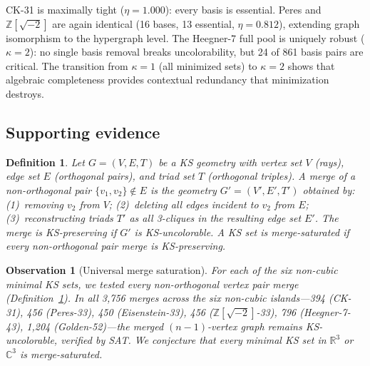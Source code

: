 \documentclass[12pt,a4paper]{article}
\newtheorem{definition}[theorem]{Definition}
\newtheorem{observation}[theorem]{Observation}
\newcommand{\R}{\mathbb{R}}
\newcommand{\C}{\mathbb{C}}
\newcommand{\Z}{\mathbb{Z}}
\begin{document}
CK-31 is maximally tight ($\eta = 1.000$): every basis is essential.  Peres and $\Z[\sqrt{-2}]$ are again identical (16 bases, 13 essential, $\eta = 0.812$), extending graph isomorphism to the hypergraph level.  The Heegner-7 full pool is uniquely robust ($\kappa = 2$): no single basis removal breaks uncolorability, but 24 of 861 basis pairs are critical.  The transition from $\kappa = 1$ (all minimized sets) to $\kappa = 2$ shows that algebraic completeness provides contextual redundancy that minimization destroys.

\subsection{Supporting evidence}\label{sec:supporting}

\begin{definition}\label{def:merge}
Let $G = (V, E, T)$ be a KS geometry with vertex set $V$ (rays), edge set $E$ (orthogonal pairs), and triad set $T$ (orthogonal triples).  A \emph{merge} of a non-orthogonal pair $\{v_1, v_2\} \notin E$ is the geometry $G' = (V', E', T')$ obtained by: (1)~removing $v_2$ from $V$; (2)~deleting all edges incident to $v_2$ from $E$; (3)~reconstructing triads $T'$ as all 3-cliques in the resulting edge set $E'$.  The merge is \emph{KS-preserving} if $G'$ is KS-uncolorable.  A KS set is \emph{merge-saturated} if every non-orthogonal pair merge is KS-preserving.
\end{definition}

\begin{observation}[Universal merge saturation]\label{obs:merge}
For each of the six non-cubic minimal KS sets, we tested every non-orthogonal vertex pair merge (Definition~\ref{def:merge}). In all 3{,}756 merges across the six non-cubic islands---394 (CK-31), 456 (Peres-33), 450 (Eisenstein-33), 456 ($\Z[\sqrt{-2}]$-33), 796 (Heegner-7-43), 1{,}204 (Golden-52)---the merged $(n{-}1)$-vertex graph remains KS-uncolorable, verified by SAT. We conjecture that every minimal KS set in $\R^3$ or $\C^3$ is merge-saturated.
\end{observation}
\end{document}
